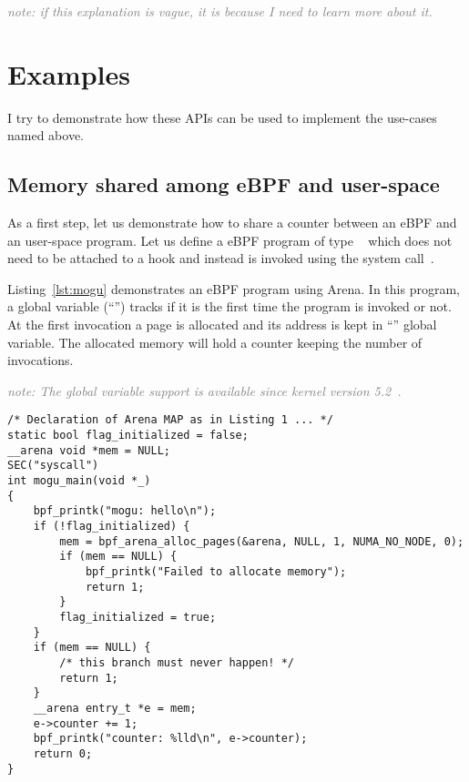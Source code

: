\documentclass{article}
\begin{document}
\textcolor{gray}{\emph{note: if this explanation is vague, it is because I need
to learn more about it.}}


\section{Examples}

I try to demonstrate how these APIs can be used to implement the use-cases
named above.

\subsection{Memory shared among eBPF and user-space}

As a first step, let us demonstrate how to share a counter between an eBPF
and an user-space program. Let us define a eBPF program of type
~\cite{ebpf_docs_prog_syscall} which does not need to
be attached to a hook and instead is invoked using the 
system call~\cite{ebpf_docs_bpf_prog_run}.

Listing~\ref{lst:mogu} demonstrates an eBPF program using Arena. In this
program, a global variable (``'') tracks if it is the first
time the program is invoked or not. At the first invocation a page is allocated
and its address is kept in ``'' global variable. The allocated memory
will hold a counter keeping the number of invocations.

\textcolor{gray}{\textit{note: The global variable support is available since
kernel version 5.2~\cite{glb_var_post}.}}

\begin{minipage}{\linewidth}
\begin{flushleft}
\begin{lstlisting}[caption={An eBPF program using Arena.}, label={lst:mogu}]
/* Declaration of Arena MAP as in Listing 1 ... */
static bool flag_initialized = false;
__arena void *mem = NULL;
SEC("syscall")
int mogu_main(void *_)
{
    bpf_printk("mogu: hello\n");
    if (!flag_initialized) {
        mem = bpf_arena_alloc_pages(&arena, NULL, 1, NUMA_NO_NODE, 0);
        if (mem == NULL) {
            bpf_printk("Failed to allocate memory");
            return 1;
        }
        flag_initialized = true;
    }
    if (mem == NULL) {
        /* this branch must never happen! */
        return 1;
    }
    __arena entry_t *e = mem;
    e->counter += 1;
    bpf_printk("counter: %lld\n", e->counter);
    return 0;
}
\end{lstlisting}
\end{flushleft}
\end{minipage}
\end{document}
